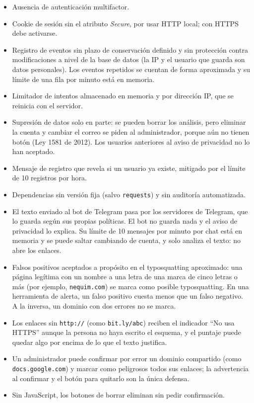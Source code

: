 \documentclass[journal,onecolumn,12pt,draftclsnofoot]{IEEEtran}
\begin{document}
\begin{itemize}
  \item Ausencia de autenticación multifactor.
  \item Cookie de sesión sin el atributo \emph{Secure}, por usar HTTP local; con HTTPS debe activarse.
  \item Registro de eventos sin plazo de conservación definido y sin protección contra modificaciones a nivel de la base de datos (la IP y el usuario que guarda son datos personales). Los eventos repetidos se cuentan de forma aproximada y su límite de una fila por minuto está en memoria.
  \item Limitador de intentos almacenado en memoria y por dirección IP, que se reinicia con el servidor.
  \item Supresión de datos solo en parte: se pueden borrar los análisis, pero eliminar la cuenta y cambiar el correo se piden al administrador, porque aún no tienen botón (Ley 1581 de 2012). Los usuarios anteriores al aviso de privacidad no lo han aceptado.
  \item Mensaje de registro que revela si un usuario ya existe, mitigado por el límite de 10 registros por hora.
  \item Dependencias sin versión fija (salvo \texttt{requests}) y sin auditoría automatizada.
  \item El texto enviado al bot de Telegram pasa por los servidores de Telegram, que lo guarda según sus propias políticas. El bot no guarda nada y el aviso de privacidad lo explica. Su límite de 10 mensajes por minuto por chat está en memoria y se puede saltar cambiando de cuenta, y solo analiza el texto: no abre los enlaces.
  \item Falsos positivos aceptados a propósito en el typosquatting aproximado: una página legítima con un nombre a una letra de una marca de cinco letras o más (por ejemplo, \texttt{nequim.com}) se marca como posible typosquatting. En una herramienta de alerta, un falso positivo cuesta menos que un falso negativo. A la inversa, un dominio con dos errores no se marca.
  \item Los enlaces sin \texttt{http://} (como \texttt{bit.ly/abc}) reciben el indicador ``No usa HTTPS'' aunque la persona no haya escrito el esquema, y el puntaje puede quedar algo por encima de lo que el texto justifica.
  \item Un administrador puede confirmar por error un dominio compartido (como \texttt{docs.google.com}) y marcar como peligrosos todos sus enlaces; la advertencia al confirmar y el botón para quitarlo son la única defensa.
  \item Sin JavaScript, los botones de borrar eliminan sin pedir confirmación.
\end{itemize}
\end{document}

